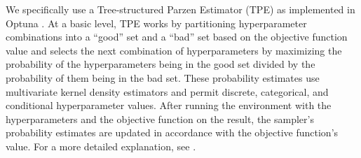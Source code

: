 We specifically use a Tree-structured Parzen Estimator (TPE) \citep{bergstra2011tpe} as implemented in Optuna \citep[MIT license]{optuna}.
At a basic level, TPE works by partitioning hyperparameter combinations into a ``good'' set and a ``bad'' set based on the objective function value and selects the next combination of hyperparameters by maximizing the probability of the hyperparameters being in the good set divided by the probability of them being in the bad set.
These probability estimates use multivariate kernel density estimators and permit discrete, categorical, and conditional hyperparameter values.
After running the environment with the hyperparameters and the objective function on the result, the sampler's probability estimates are updated in accordance with the objective function's value.
For a more detailed explanation, see \citet{watanabe2023tpe-tutorial}.

